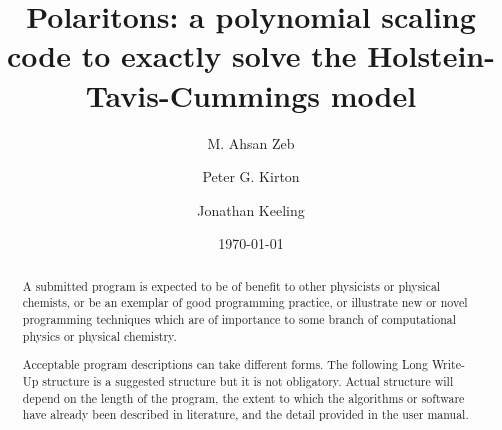 \documentclass[final,twocolumn]{elsarticle}
\begin{document}
\begin{frontmatter}



\title{Polaritons: a polynomial scaling code to exactly solve the Holstein-Tavis-Cummings model}


\author{M. Ahsan Zeb }
\author{Peter G. Kirton}
\author{Jonathan Keeling}
\date{\today}




\address{SUPA, School of Physics and Astronomy, University of St Andrews, St Andrews, KY16 9SS, United Kingdom}

\begin{abstract}
A submitted program is expected to be of benefit to other physicists or physical chemists, or be an exemplar of good programming practice, or illustrate new or novel programming techniques which are of importance to some branch of computational physics or physical chemistry.

Acceptable program descriptions can take different forms. The following Long Write-Up structure is a suggested structure but it is not obligatory. Actual structure will depend on the length of the program, the extent to which the algorithms or software have already been described in literature, and the detail provided in the user manual.


\end{abstract}
\end{frontmatter}
\end{document}
